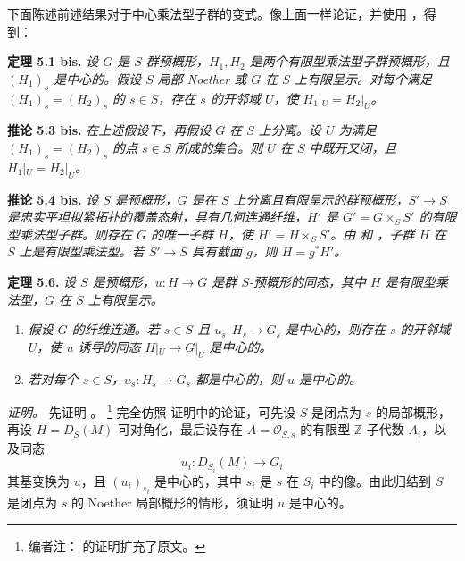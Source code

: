下面陈述前述结果对于中心乘法型子群的变式。像上面一样论证，并使用 ，得到：

\medskip
\noindent{}\textbf{定理 5.1 bis.}
\textit{设 \(G\) 是 \(S\)-群预概形，\(H_1,H_2\) 是两个有限型乘法型子群预概形，且 \((H_1)_s\) 是中心的。假设 \(S\) 局部 Noether 或 \(G\) 在 \(S\) 上有限呈示。对每个满足 \((H_1)_s=(H_2)_s\) 的 \(s\in S\)，存在 \(s\) 的开邻域 \(U\)，使 \(H_1|_U=H_2|_U\)。}

\medskip
\noindent{}\textbf{推论 5.3 bis.}
\textit{在上述假设下，再假设 \(G\) 在 \(S\) 上分离。设 \(U\) 为满足 \((H_1)_s=(H_2)_s\) 的点 \(s\in S\) 所成的集合。则 \(U\) 在 \(S\) 中既开又闭，且 \(H_1|_U=H_2|_U\)。}

\medskip
\noindent{}\textbf{推论 5.4 bis.}
\textit{设 \(S\) 是预概形，\(G\) 是在 \(S\) 上分离且有限呈示的群预概形，\(S'\to S\) 是忠实平坦拟紧拓扑的覆盖态射，具有几何连通纤维，\(H'\) 是 \(G'=G\times_SS'\) 的有限型乘法型子群。则存在 \(G\) 的唯一子群 \(H\)，使 \(H'=H\times_SS'\)。由  和 ，子群 \(H\) 在 \(S\) 上是有限型乘法型。若 \(S'\to S\) 具有截面 \(g\)，则 \(H=g^*H'\)。}

\medskip
\noindent{}\textbf{定理 5.6.}
\textit{设 \(S\) 是预概形，\(u:H\to G\) 是群 \(S\)-预概形的同态，其中 \(H\) 是有限型乘法型，\(G\) 在 \(S\) 上有限呈示。}
\begin{enumerate}
  \item[(a)]
  \textit{假设 \(G\) 的纤维连通。若 \(s\in S\) 且 \(u_s:H_s\to G_s\) 是中心的，则存在 \(s\) 的开邻域 \(U\)，使 \(u\) 诱导的同态 \(H|_U\to G|_U\) 是中心的。}

  \item[(b)]
  \textit{若对每个 \(s\in S\)，\(u_s:H_s\to G_s\) 都是中心的，则 \(u\) 是中心的。}
\end{enumerate}

\emph{证明。}
先证明 。%
\footnote{编者注： 的证明扩充了原文。}
完全仿照  证明中的论证，可先设 \(S\) 是闭点为 \(s\) 的局部概形，再设 \(H=D_S(M)\) 可对角化，最后设存在 \(A=\mathscr O_{S,s}\) 的有限型 \(\mathbb Z\)-子代数 \(A_i\)，以及同态
\[
  u_i:D_{S_i}(M)\longrightarrow G_i
\]
其基变换为 \(u\)，且 \((u_i)_{s_i}\) 是中心的，其中 \(s_i\) 是 \(s\) 在 \(S_i\) 中的像。由此归结到 \(S\) 是闭点为 \(s\) 的 Noether 局部概形的情形，须证明 \(u\) 是中心的。

